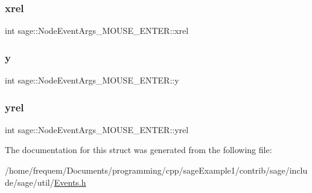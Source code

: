 \subsubsection{\texorpdfstring{xrel}{xrel}}
{\footnotesize\ttfamily int sage\+::\+Node\+Event\+Args\+\_\+\+M\+O\+U\+S\+E\+\_\+\+E\+N\+T\+E\+R\+::xrel}

\mbox{\label{structsage_1_1NodeEventArgs__MOUSE__ENTER_ad00b8a1036a9cace990e55ed419fbfae}} 
\subsubsection{\texorpdfstring{y}{y}}
{\footnotesize\ttfamily int sage\+::\+Node\+Event\+Args\+\_\+\+M\+O\+U\+S\+E\+\_\+\+E\+N\+T\+E\+R\+::y}

\mbox{\label{structsage_1_1NodeEventArgs__MOUSE__ENTER_a8ef24c0b4df8f36993621d4ef7921488}} 
\subsubsection{\texorpdfstring{yrel}{yrel}}
{\footnotesize\ttfamily int sage\+::\+Node\+Event\+Args\+\_\+\+M\+O\+U\+S\+E\+\_\+\+E\+N\+T\+E\+R\+::yrel}



The documentation for this struct was generated from the following file\+:\begin{DoxyCompactItemize}
\item 
/home/frequem/\+Documents/programming/cpp/sage\+Example1/contrib/sage/include/sage/util/\mbox{\hyperlink{Events_8h}{Events.\+h}}\end{DoxyCompactItemize}
